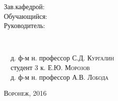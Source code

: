 \begin{titlepage}
\begin{minipage}{0.18\textwidth}
\begin{flushleft}
\textrm{Зав.кафедрой:}\\[0.2cm]
\textrm{Обучающийся:}\\[0.2cm]
\textrm{Руководитель:}\\
\end{flushleft}
\end{minipage}
~\begin{minipage}{0.7\textwidth}
\begin{flushright}
~\hrulefill~д. ф-м н. профессор \textsc{С.Д. Кургалин} \\ [0.2cm]
~\hrulefill~студент 3 к. \textsc{Е.Ю. Морозов} \\ [0.2cm]
~\hrulefill~д. ф-м н. профессор \textsc{А.В. Лобода} \\ [0.2cm]
\end{flushright}
\end{minipage}




 

\vfill %
\textsc{Воронеж}, 2016
\end{titlepage}

\null\vspace{\fill}

